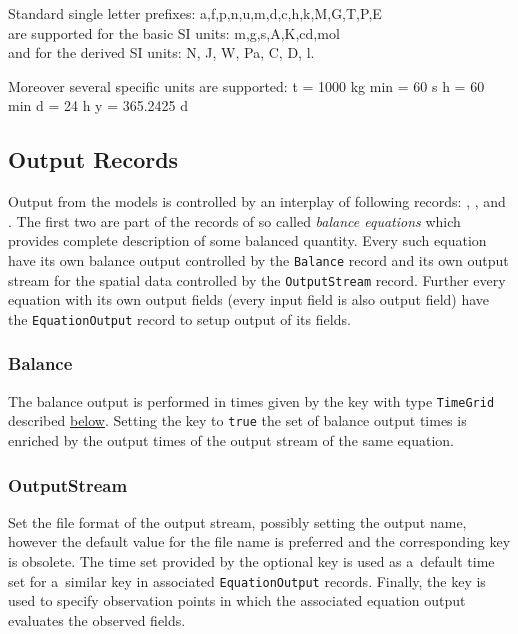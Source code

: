 Standard single letter prefixes: a,f,p,n,u,m,d,c,h,k,M,G,T,P,E\\
are supported for the basic SI units: m,g,s,A,K,cd,mol\\
and for the derived SI units: N, J, W, Pa, C, D, l.

Moreover several specific units are supported: 
t = 1000 kg
min = 60 s 
h = 60 min
d = 24 h
y = 365.2425 d




\subsection{Output Records}
Output from the models is controlled by an interplay of following records: ,
, and . The first two are part of the 
records of so called {\it balance equations} which provides complete description of some balanced quantity. 
Every such equation have its own balance output controlled by the \verb'Balance' record and its own output stream for the 
spatial data controlled by the \verb'OutputStream' record. Further every equation with its own output fields 
(every input field is also output field) have the \verb'EquationOutput' record to setup output of its fields.

\subsubsection{Balance}
The balance output is performed in times given by the key 
with type \verb'TimeGrid' described \hyperlink{sec:TimeGrid}{below}. Setting the key  
to \verb'true' the set of balance output times is enriched by the output times of the output stream of the same equation.

\subsubsection{OutputStream}
Set the file format of the output stream, possibly setting the output name, however the default value for the file name is preferred and the corresponding key 
 is obsolete.
The time set provided by the optional key  is used as a~default time set for a~similar key in associated 
\verb'EquationOutput' records. Finally, the key  is used to specify observation points
in which the associated equation output evaluates the observed fields.

